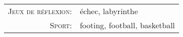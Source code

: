 \begin{tabular}{rl}
    \textsc{Jeux de réflexion:} & échec, labyrinthe \\
   \textsc{Sport:} & footing, football, basketball \\
\end{tabular}